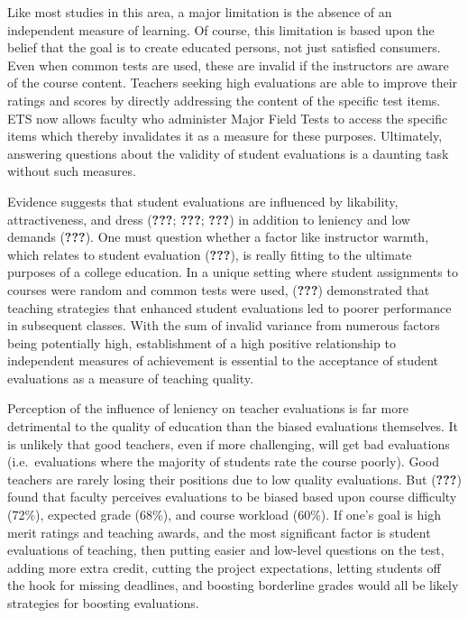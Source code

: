\documentclass[man]{apa6}
\theoremstyle{definition}
\theoremstyle{definition}
\theoremstyle{definition}
\theoremstyle{remark}
\begin{document}
Like most studies in this area, a major limitation is the absence of an
independent measure of learning. Of course, this limitation is based
upon the belief that the goal is to create educated persons, not just
satisfied consumers. Even when common tests are used, these are invalid
if the instructors are aware of the course content. Teachers seeking
high evaluations are able to improve their ratings and scores by
directly addressing the content of the specific test items. ETS now
allows faculty who administer Major Field Tests to access the specific
items which thereby invalidates it as a measure for these purposes.
Ultimately, answering questions about the validity of student
evaluations is a daunting task without such measures.

Evidence suggests that student evaluations are influenced by likability,
attractiveness, and dress ({\textbf{???}}; {\textbf{???}};
{\textbf{???}}) in addition to leniency and low demands
({\textbf{???}}). One must question whether a factor like instructor
warmth, which relates to student evaluation ({\textbf{???}}), is really
fitting to the ultimate purposes of a college education. In a unique
setting where student assignments to courses were random and common
tests were used, ({\textbf{???}}) demonstrated that teaching strategies
that enhanced student evaluations led to poorer performance in
subsequent classes. With the sum of invalid variance from numerous
factors being potentially high, establishment of a high positive
relationship to independent measures of achievement is essential to the
acceptance of student evaluations as a measure of teaching quality.

Perception of the influence of leniency on teacher evaluations is far
more detrimental to the quality of education than the biased evaluations
themselves. It is unlikely that good teachers, even if more challenging,
will get bad evaluations (i.e.~evaluations where the majority of
students rate the course poorly). Good teachers are rarely losing their
positions due to low quality evaluations. But ({\textbf{???}}) found
that faculty perceives evaluations to be biased based upon course
difficulty (72\%), expected grade (68\%), and course workload (60\%). If
one's goal is high merit ratings and teaching awards, and the most
significant factor is student evaluations of teaching, then putting
easier and low-level questions on the test, adding more extra credit,
cutting the project expectations, letting students off the hook for
missing deadlines, and boosting borderline grades would all be likely
strategies for boosting evaluations.
\end{document}
